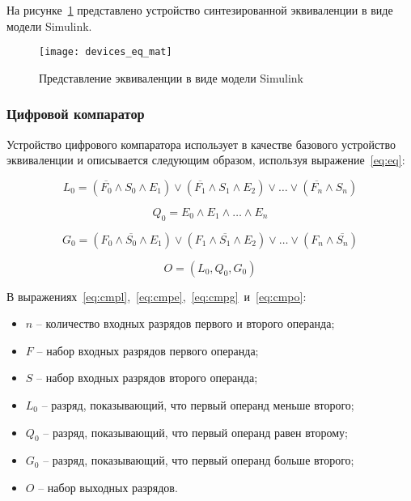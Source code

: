 \documentclass[document.tex]{subfiles}
\begin{document}
На рисунке~\ref{fig:deviceeqmat} представлено устройство
синтезированной эквиваленции в виде модели Simulink.

\begin{figure}[here]
\texttt{[image: devices\_eq\_mat]}
\caption{Представление эквиваленции в виде модели Simulink}
\label{fig:deviceeqmat}
\end{figure}

\clearpage
\subsubsection{Цифровой компаратор}
Устройство цифрового компаратора использует в качестве базового устройство
эквиваленции и описывается следующим образом, используя выражение~\ref{eq:eq}:

\begin{equation}
\label{eq:cmpl}
L_0 = (\overline{F_0} \wedge S_0 \wedge E_1) \vee (\overline{F_1} \wedge
S_1 \wedge E_2) \vee \ldots \vee (\overline{F_n} \wedge S_n)
\end{equation}

\begin{equation}
\label{eq:cmpe}
Q_0 = E_0 \wedge E_1 \wedge \ldots \wedge E_n
\end{equation}

\begin{equation}
\label{eq:cmpg}
G_0 = (F_0 \wedge \overline{S_0} \wedge E_1) \vee (F_1 \wedge \overline{S_1}
\wedge E_2) \vee \ldots \vee (F_n \wedge \overline{S_n})
\end{equation}

\begin{equation}
\label{eq:cmpo}
O = (L_0, Q_0, G_0)
\end{equation}

В выражениях~\ref{eq:cmpl},~\ref{eq:cmpe},~\ref{eq:cmpg}~и~\ref{eq:cmpo}:
\begin{itemize}[noitemsep]
  \item $n$ -- количество входных разрядов первого и второго операнда;
  \item $F$ -- набор входных разрядов первого операнда;
  \item $S$ -- набор входных разрядов второго операнда;
  \item $L_0$ -- разряд, показывающий, что первый операнд меньше второго;
  \item $Q_0$ -- разряд, показывающий, что первый операнд равен второму;
  \item $G_0$ -- разряд, показывающий, что первый операнд больше второго;
  \item $O$ -- набор выходных разрядов.
\end{itemize}
\end{document}

